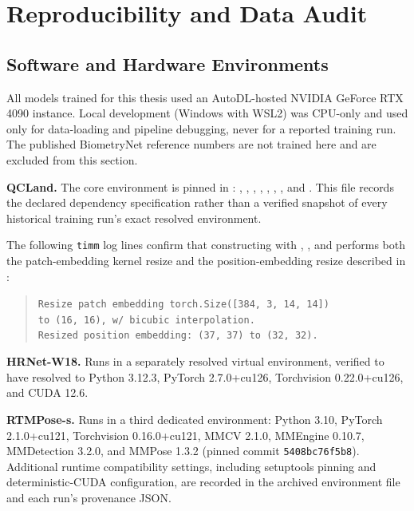 \chapter{Reproducibility and Data Audit}
\label{app:reproducibility}



\section{Software and Hardware Environments}
\label{app:environments}

All models trained for this thesis used an AutoDL-hosted NVIDIA
GeForce RTX 4090 instance. Local development (Windows with WSL2) was
CPU-only and used only for data-loading and pipeline debugging, never
for a reported training run. The published BiometryNet reference
numbers are not trained here and are excluded from this section.

\textbf{QCLand.} The core environment is pinned in
: ,
, ,
, ,
, , and
. This file records the declared
dependency specification rather than a verified snapshot of every
historical training run's exact resolved environment.

The following \texttt{timm} log lines confirm that constructing
 with
, , and
 performs both the patch-embedding kernel
resize and the position-embedding resize described in
:

\begin{quote}
\small
\texttt{Resize patch embedding torch.Size([384, 3, 14, 14])}\\
\texttt{to (16, 16), w/ bicubic interpolation.}\\
\texttt{Resized position embedding: (37, 37) to (32, 32).}
\end{quote}

\textbf{HRNet-W18.} Runs in a separately resolved virtual
environment, verified to have resolved to Python 3.12.3,
PyTorch 2.7.0+cu126, Torchvision 0.22.0+cu126, and CUDA 12.6.

\textbf{RTMPose-s.} Runs in a third dedicated environment: Python
3.10, PyTorch 2.1.0+cu121, Torchvision 0.16.0+cu121, MMCV 2.1.0,
MMEngine 0.10.7, MMDetection 3.2.0, and MMPose 1.3.2 (pinned commit
\texttt{5408bc76f5b8}). Additional runtime compatibility settings,
including setuptools pinning and deterministic-CUDA configuration,
are recorded in the archived environment file and each run's
provenance JSON.


